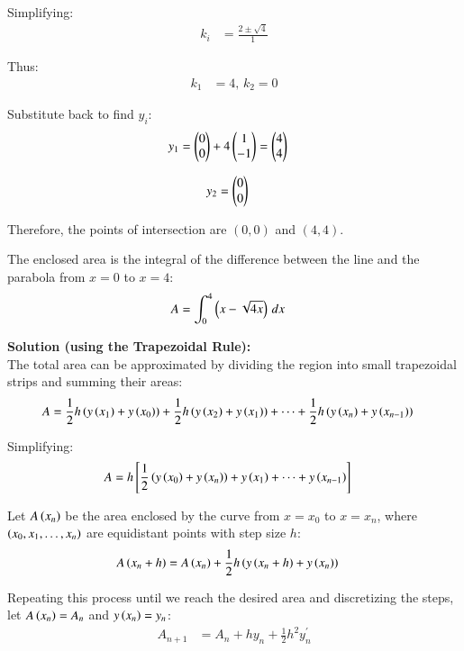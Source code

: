 \documentclass[journal]{IEEEtran}
\begin{document}
\begin{enumerate}
Simplifying:
\begin{align}
k_i &= \frac{2 \pm \sqrt{4}}{1}
\end{align}

Thus:
\begin{align}
k_1 &= 4, \, k_2 = 0
\end{align}

Substitute back to find $y_i$:
\begin{align}
y_1 &= \begin{pmatrix}0 \\ 0\end{pmatrix} + 4 \begin{pmatrix}1 \\ -1\end{pmatrix} = \begin{pmatrix}4 \\ 4\end{pmatrix}
\end{align}

\begin{align}
y_2 &= \begin{pmatrix}0 \\ 0\end{pmatrix}
\end{align}

Therefore, the points of intersection are $(0, 0)$ and $(4, 4)$.

The enclosed area is the integral of the difference between the line and the parabola from $x = 0$ to $x = 4$:
\begin{align}
A &= \int_0^4 \left(x - \sqrt{4x}\right) \, dx
\end{align}

\textbf{Solution (using the Trapezoidal Rule):}\\

The total area can be approximated by dividing the region into small trapezoidal strips and summing their areas:
\begin{align}
A &= \frac{1}{2} h \left(y\left(x_1\right) + y\left(x_0\right)\right) + \frac{1}{2} h \left(y\left(x_2\right) + y\left(x_1\right)\right) + \cdots + \frac{1}{2} h \left(y\left(x_n\right) + y\left(x_{n-1}\right)\right)
\end{align}

Simplifying:
\begin{align}
A &= h \left[ \frac{1}{2} \left(y\left(x_0\right) + y\left(x_n\right)\right) + y\left(x_1\right) + \cdots + y\left(x_{n-1}\right) \right]
\end{align}

Let $A\left(x_n\right)$ be the area enclosed by the curve from $x = x_0$ to $x = x_n$, where $\left(x_0, x_1, \dots, x_n\right)$ are equidistant points with step size $h$:
\begin{align}
A\left(x_n + h\right) &= A\left(x_n\right) + \frac{1}{2} h \left(y\left(x_n + h\right) + y\left(x_n\right)\right)
\end{align}

Repeating this process until we reach the desired area and discretizing the steps, let $A\left(x_n\right) = A_n$ and $y\left(x_n\right) = y_n$:
\begin{align}
A_{n+1} &= A_n + h y_n + \frac{1}{2} h^2 y^{\prime}_n
\end{align}


\end{enumerate}
\end{document}
